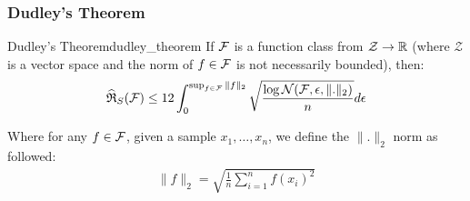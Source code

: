 \subsubsection{Dudley's Theorem}
\begin{theorem}{Dudley's Theorem}{dudley_theorem}
    If $\mathcal{F}$ is a function class from $\mathcal{Z}\to\mathbb{R}$ (where $\mathcal{Z}$ is a vector space and the norm of $f\in\mathcal{F}$ is not necessarily bounded), then:
    \begin{align*}
        \widehat{\mathfrak{R}}_S(\mathcal{F}) \le 12\int_0^{\sup_{f\in\mathcal{F}}\|f\|_2} \sqrt{
            \frac{\log \mathcal{N}(\mathcal{F}, \epsilon, \|.\|_2)}{n}
        }d\epsilon
    \end{align*}

    \noindent Where for any $f\in\mathcal{F}$, given a sample $x_1, \dots, x_n$, we define the $\|.\|_2$ norm as followed:
    \begin{align*}
        \|f\|_2 = \sqrt{
            \frac{1}{n}\sum_{i=1}^n f(x_i)^2
        }
    \end{align*}
\end{theorem}
